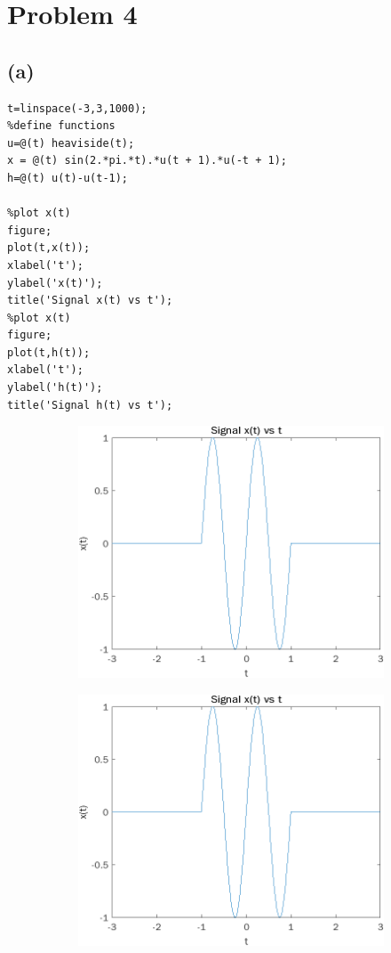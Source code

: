 \documentclass[12pt]{article}
\begin{document}
\section*{Problem 4}
\subsection*{(a)}
\begin{lstlisting}
t=linspace(-3,3,1000);
%define functions
u=@(t) heaviside(t);
x = @(t) sin(2.*pi.*t).*u(t + 1).*u(-t + 1);
h=@(t) u(t)-u(t-1);

%plot x(t)
figure;
plot(t,x(t));
xlabel('t');
ylabel('x(t)');
title('Signal x(t) vs t');
%plot x(t)
figure;
plot(t,h(t));
xlabel('t');
ylabel('h(t)');
title('Signal h(t) vs t');
\end{lstlisting}
\begin{figure}
\centering
\begin{subfigure}{.5\textwidth}
  \centering
  \includegraphics[width=.4\linewidth]{4a1}
\end{subfigure}%
\begin{subfigure}{.5\textwidth}
  \centering
  \includegraphics[width=.4\linewidth]{4a1}
\end{subfigure}
\end{figure}
\end{document}
